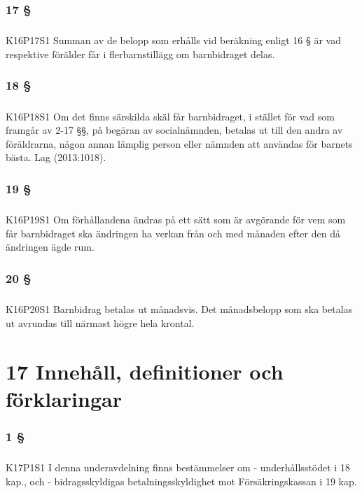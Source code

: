 \documentclass[a4paper,notitlepage,openany,10pt]{book}
\begin{document}
\subsection*{17 §}
\paragraph*{}
{\tiny K16P17S1}
Summan av de belopp som erhålls vid beräkning enligt 16 § är vad respektive förälder får i flerbarnstillägg om barnbidraget delas.
\subsection*{18 §}
\paragraph*{}
{\tiny K16P18S1}
Om det finns särskilda skäl får barnbidraget, i stället för vad som framgår av 2-17 §§, på begäran av socialnämnden, betalas ut till den andra av föräldrarna, någon annan lämplig person eller nämnden att användas för barnets bästa.
Lag (2013:1018).
\subsection*{19 §}
\paragraph*{}
{\tiny K16P19S1}
Om förhållandena ändras på ett sätt som är avgörande för vem som får barnbidraget ska ändringen ha verkan från och med månaden efter den då ändringen ägde rum.
\subsection*{20 §}
\paragraph*{}
{\tiny K16P20S1}
Barnbidrag betalas ut månadsvis. Det månadsbelopp som ska betalas ut avrundas till närmast högre hela krontal.
\chapter*{17 Innehåll, definitioner och förklaringar}
\subsection*{1 §}
\paragraph*{}
{\tiny K17P1S1}
I denna underavdelning finns bestämmelser om
\newline - underhållsstödet i 18 kap., och
\newline - bidragsskyldigas betalningsskyldighet mot Försäkringskassan i 19 kap.
\end{document}
